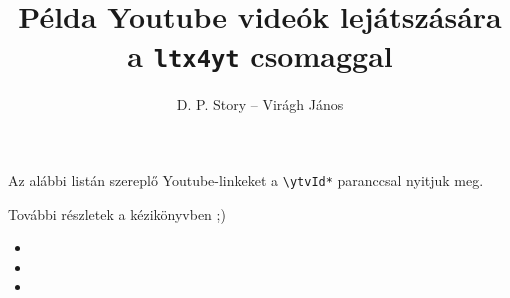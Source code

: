 \documentclass{article}
\title{Példa Youtube videók lejátszására a \texttt{ltx4yt} csomaggal}
\author{D. P. Story -- Virágh János}
\begin{document}
\maketitle
Az alábbi listán szereplő Youtube-linkeket a \verb!\ytvId*! paranccsal nyitjuk meg.

További részletek a kézikönyvben ;)
\begin{itemize}
\item {}
\item {}
\item {}
\end{itemize}
\end{document}
